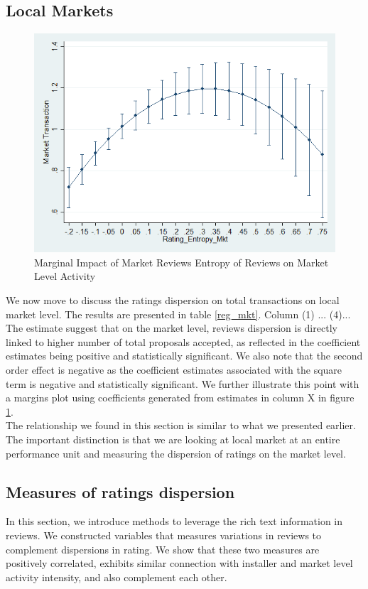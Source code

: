 \documentclass[msom,blindrev]{informs3}
\begin{document}
\subsection{Local Markets}

\begin{figure}
	\centering
	\includegraphics[width=0.7\linewidth]{marginsplot_entmkt.png}
	\caption{Marginal Impact of Market Reviews Entropy of Reviews on Market Level Activity}
	\label{marginsplot_mkt_entmkt}
\end{figure}

We now move to discuss the ratings dispersion on total transactions on local market level. The results are presented in table \ref{reg_mkt}. Column (1) ... (4)... The estimate suggest that on the market level, reviews dispersion is directly linked to higher number of total proposals accepted, as reflected in the coefficient estimates being positive and statistically significant. We also note that the second order effect is negative as the coefficient estimates associated with the square term is negative and statistically significant. We further illustrate this point with a margins plot using coefficients generated from estimates in column X in figure \ref{marginsplot_mkt_entmkt}. \\
The relationship we found in this section is similar to what we presented earlier. The important distinction is that we are looking at local market at an entire performance unit and measuring the dispersion of ratings on the market level.

\subsection{Measures of ratings dispersion}
In this section, we introduce methods to leverage the rich text information in reviews. We constructed variables that measures variations in reviews to complement dispersions in rating. We show that these two measures are positively correlated, exhibits similar connection with installer and market level activity intensity, and also complement each other. 
\end{document}
